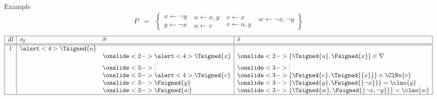 \begin{frame}{Example}
%
\begin{eqnarray*}
P
& = &
\left\{
  \begin{array}{l}
x  \leftarrow  \neg y\\%
y  \leftarrow  \neg x
\end{array}
\
\begin{array}{l}
u  \leftarrow x,y\\%
u  \leftarrow v%
\end{array}
\
\begin{array}{l}
v  \leftarrow x\\%
v  \leftarrow u,y%
\end{array}
\
\begin{array}{l}
w  \leftarrow \neg x,\neg y\\
\mbox{~}
\end{array}
\right\}
\end{eqnarray*}
%
\[
\begin{array}[b]{|c|ll|l|}
\hline
\mathit{dl}& \sigma_{\!d} & \overline{\sigma} & \delta
\\\hline\hline
1 & \alert<4>{\Tsigned{u}} & \phantom{\Fsigned{\{x,y\}}}&\phantom{\{\Tsigned{u},\Fsigned{\{x\}},\Fsigned{\{x,y\}}\}=\lambda(u,\{u,v\})}
\\
  & \phantom{\Fsigned{\{\neg x,\neg y\}}}& \onslide<2->{\alert<4>{\Tsigned{x}}} & \onslide<2->{\{\Tsigned{u},\Fsigned{x}\}\in\nabla}
\\
  & & \onslide<3->{\vdots} & \onslide<3->{\vdots}
\\
  & & \onslide<3->{\alert<4>{\Tsigned{v}}} & \onslide<3->{\{\Fsigned{v},\Tsigned{\{x\}}\}\in\ClNo{v}}
\\
  & & \onslide<3->{\Fsigned{y}} & \onslide<3->{\{\Tsigned{y},\Fsigned{\{\neg x\}}\}=\clno{y}}
\\
  & & \onslide<3->{\Fsigned{w}} & \onslide<3->{\{\Tsigned{w},\Fsigned{\{\neg x,\neg y\}}\}=\clno{w}}
\\\hline
\end{array}
\]
\bigskip\bigskip\bigskip\bigskip\bigskip\bigskip
\end{frame}
%
